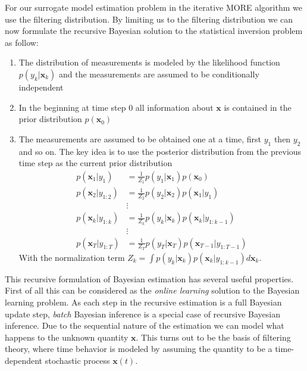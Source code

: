 For our surrogate model estimation problem in the iterative MORE
algorithm we use the filtering distribution.
By limiting us to the filtering distribution we can now
formulate the recursive Bayesian solution
to the statistical inversion problem as follow:
\begin{enumerate}
\item The distribution of measurements is modeled by the likelihood
  function $p(y_k | \mathbf{x}_k)$ and the measurements are assumed
  to be conditionally independent
\item In the beginning at time step 0 all information about $\mathbf{x}$
  is contained in the prior distribution $p(\mathbf{x}_0)$
\item The measurements are assumed to be obtained one at a time,
  first $y_1$ then $y_2$ and so on. The key idea is to use the posterior
  distribution from the previous time step as the current prior
  distribution
  \begin{align*}
    p(\mathbf{x}_1 | y_{1}) &= \frac{1}{Z_1} p(y_1 | \mathbf{x}_1) p(\mathbf{x}_0) \\
    p(\mathbf{x}_2 | y_{1:2}) &= \frac{1}{Z_2} p(y_2 | \mathbf{x}_2) p(\mathbf{x}_1 | y_1) \\
                            &\vdots \\
    p(\mathbf{x}_k | y_{1:k}) &= \frac{1}{Z_k} p(y_k | \mathbf{x}_k)
                                p(\mathbf{x}_k | y_{1:k-1}) \\
                            &\vdots \\
    p(\mathbf{x}_T | y_{1:T}) &= \frac{1}{Z_T} p(y_T | \mathbf{x}_T) p(\mathbf{x}_{T-1} | y_{1:T-1})
  \end{align*}
  With the normalization term $Z_k = \int p(y_k | \mathbf{x}_k)
  p(\mathbf{x}_k | y_{1:k-1})
  d \mathbf{x}_k$. 
\end{enumerate}

This recursive formulation of Bayesian estimation has several useful
properties. First of all this can be considered as the
\textit{online learning} solution to the Bayesian learning problem.
As each step in the recursive estimation is a full Bayesian update step,
\textit{batch} Bayesian inference is a special case of recursive Bayesian
inference. Due to the sequential nature of the estimation we can model
what happens to the unknown quantity $\mathbf{x}$. This turns out
to be the basis of filtering theory, where time behavior is modeled
by assuming the quantity to be a time-dependent stochastic process
$\mathbf{x}(t)$.

